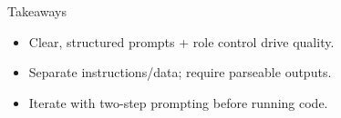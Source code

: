 \documentclass[aspectratio=169]{beamer}
\begin{document}
\begin{frame}{Takeaways}
  \begin{itemize}
    \item Clear, structured prompts + role control drive quality.
    \item Separate instructions/data; require parseable outputs.
    \item Iterate with two-step prompting before running code.
  \end{itemize}
\end{frame}
\end{document}
